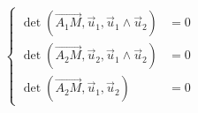 \begin{equation*}
 \left\lbrace 
\begin{aligned}
 \det(\overrightarrow{A_1M},\overrightarrow u _1, \overrightarrow u _1 \wedge \overrightarrow u _2) &=0\\
 \det(\overrightarrow{A_2M},\overrightarrow u _2, \overrightarrow u _1 \wedge \overrightarrow u _2) &=0 \\
 \det(\overrightarrow{A_2M},\overrightarrow u _1, \overrightarrow u _2 ) &=0
\end{aligned}
\right. 
\end{equation*}
